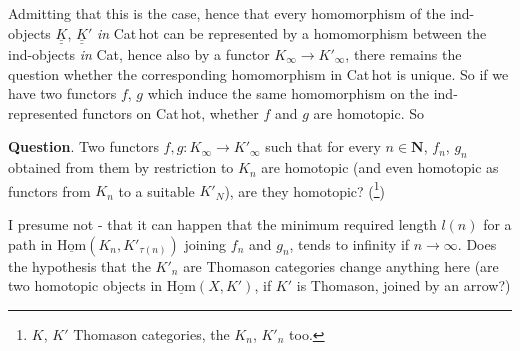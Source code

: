 \documentclass[11pt]{article}
\newcommand{\printedpage}[1]{\marginpar{\footnotesize p.~#1}}
\newcommand{\msp}[1]{\marginpar{\footnotesize [#1]}}
\newcommand{\uHom}{\underline{\mathrm{Hom}}}
\newcommand{\uuK}{\underline{\underline{K}}}
\begin{document}
Admitting that this is the case, hence that every homomorphism of the ind-objects $\uuK$, $\uuK'$ \textit{in} Cat\,hot can be represented by a homomorphism between the ind-objects \textit{in} Cat, hence also by a functor $K_\infty \longrightarrow K'_\infty$, there remains the question whether the corresponding homomorphism in Cat\,hot is unique. So if we have two functors $f$, $g$ which induce the same homomorphism on the ind-represented functors on Cat\,hot, whether $f$ and $g$ are homotopic. So

\textbf{Question}. Two functors $f, g : K_\infty \longrightarrow K'_\infty$ such that for every $n \in \mathbf{N}$, $f_n$, $g_n$ obtained from them by restriction to $K_n$ are homotopic (and even homotopic as functors from $K_n$ to a suitable $K'_N$), are they homotopic? (\footnote[8]{$K$, $K'$ Thomason categories, the $K_n$, $K'_n$ too.})

\printedpage{31}
\msp{page 49}
I presume not - that it can happen that the minimum required length $l(n)$ for a path in $\uHom(K_n, K'_{\tau(n)})$ joining $f_n$ and $g_n$, tends to infinity if $n \longrightarrow \infty$. Does the hypothesis that the $K'_n$ are Thomason categories change anything here (are two homotopic objects in $\uHom(X, K')$, if $K'$ is Thomason, joined by an arrow?)
\end{document}
